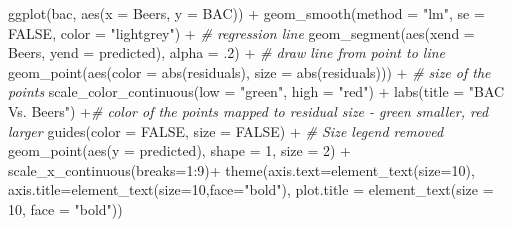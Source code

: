 \documentclass[
]{book}
\newenvironment{Shaded}{\begin{snugshade}}{\end{snugshade}}
\newcommand{\AttributeTok}[1]{\textcolor[rgb]{0.77,0.63,0.00}{#1}}
\newcommand{\CommentTok}[1]{\textcolor[rgb]{0.56,0.35,0.01}{\textit{#1}}}
\newcommand{\ConstantTok}[1]{\textcolor[rgb]{0.00,0.00,0.00}{#1}}
\newcommand{\DecValTok}[1]{\textcolor[rgb]{0.00,0.00,0.81}{#1}}
\newcommand{\FunctionTok}[1]{\textcolor[rgb]{0.00,0.00,0.00}{#1}}
\newcommand{\NormalTok}[1]{#1}
\newcommand{\SpecialCharTok}[1]{\textcolor[rgb]{0.00,0.00,0.00}{#1}}
\newcommand{\StringTok}[1]{\textcolor[rgb]{0.31,0.60,0.02}{#1}}
\begin{document}
\begin{Shaded}
\begin{Highlighting}[]
\FunctionTok{ggplot}\NormalTok{(bac, }\FunctionTok{aes}\NormalTok{(}\AttributeTok{x =}\NormalTok{ Beers, }\AttributeTok{y =}\NormalTok{ BAC)) }\SpecialCharTok{+}
  \FunctionTok{geom\_smooth}\NormalTok{(}\AttributeTok{method =} \StringTok{"lm"}\NormalTok{, }\AttributeTok{se =} \ConstantTok{FALSE}\NormalTok{, }\AttributeTok{color =} \StringTok{"lightgrey"}\NormalTok{) }\SpecialCharTok{+}     \CommentTok{\# regression line  }
  \FunctionTok{geom\_segment}\NormalTok{(}\FunctionTok{aes}\NormalTok{(}\AttributeTok{xend =}\NormalTok{ Beers, }\AttributeTok{yend =}\NormalTok{ predicted), }\AttributeTok{alpha =}\NormalTok{ .}\DecValTok{2}\NormalTok{) }\SpecialCharTok{+}      \CommentTok{\# draw line from point to line}
  \FunctionTok{geom\_point}\NormalTok{(}\FunctionTok{aes}\NormalTok{(}\AttributeTok{color =} \FunctionTok{abs}\NormalTok{(residuals), }\AttributeTok{size =} \FunctionTok{abs}\NormalTok{(residuals))) }\SpecialCharTok{+}  \CommentTok{\# size of the points}
  \FunctionTok{scale\_color\_continuous}\NormalTok{(}\AttributeTok{low =} \StringTok{"green"}\NormalTok{, }\AttributeTok{high =} \StringTok{"red"}\NormalTok{) }\SpecialCharTok{+}   
  \FunctionTok{labs}\NormalTok{(}\AttributeTok{title =} \StringTok{"BAC Vs. Beers"}\NormalTok{) }\SpecialCharTok{+}\CommentTok{\# color of the points mapped to residual size {-} green smaller, red larger}
  \FunctionTok{guides}\NormalTok{(}\AttributeTok{color =} \ConstantTok{FALSE}\NormalTok{, }\AttributeTok{size =} \ConstantTok{FALSE}\NormalTok{) }\SpecialCharTok{+}                             \CommentTok{\# Size legend removed}
  \FunctionTok{geom\_point}\NormalTok{(}\FunctionTok{aes}\NormalTok{(}\AttributeTok{y =}\NormalTok{ predicted), }\AttributeTok{shape =} \DecValTok{1}\NormalTok{, }\AttributeTok{size =} \DecValTok{2}\NormalTok{) }\SpecialCharTok{+}
  \FunctionTok{scale\_x\_continuous}\NormalTok{(}\AttributeTok{breaks=}\DecValTok{1}\SpecialCharTok{:}\DecValTok{9}\NormalTok{)}\SpecialCharTok{+}
  \FunctionTok{theme}\NormalTok{(}\AttributeTok{axis.text=}\FunctionTok{element\_text}\NormalTok{(}\AttributeTok{size=}\DecValTok{10}\NormalTok{),}
        \AttributeTok{axis.title=}\FunctionTok{element\_text}\NormalTok{(}\AttributeTok{size=}\DecValTok{10}\NormalTok{,}\AttributeTok{face=}\StringTok{"bold"}\NormalTok{),}
        \AttributeTok{plot.title =} \FunctionTok{element\_text}\NormalTok{(}\AttributeTok{size =} \DecValTok{10}\NormalTok{, }\AttributeTok{face =} \StringTok{"bold"}\NormalTok{))}
\end{Highlighting}
\end{Shaded}
\end{document}
